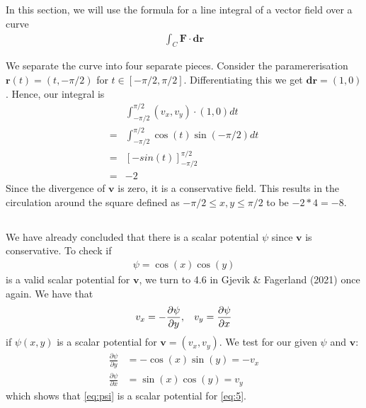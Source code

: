 \documentclass[a4paper,10pt,english]{article}
\begin{document}
\subsection{}
In this section, we will use the formula for a line integral of a vector field over a curve 
\begin{align}
    \int_C \bm{F} \cdot \bm{dr}
\end{align}

We separate the curve into four separate pieces. Consider the paramererisation $\bm{r}(t) = (t, -\pi/2)$ for $t\in[-\pi/2, \pi/2]$. Differentiating this we get $\bm{dr} = (1, 0)$. Hence, our integral is
\begin{align*}
    & \int_{-\pi/2}^{\pi/2} (v_x, v_y) \cdot (1, 0) dt \\
    = &\int_{-\pi/2}^{\pi/2} \cos(t)\sin(-\pi/2) dt \\
    = &\left[ -sin(t)\right]_{-\pi/2}^{\pi/2} \\
    = &-2
\end{align*}
Since the divergence of $\bm{v}$ is zero, it is a conservative field. This results in the circulation around the square defined as $-\pi/2 \leq x, y \leq \pi/2$ to be $-2*4 = -8$.

\subsection{}
We have already concluded that there is a scalar potential $\psi$ since $\bm{v}$ is conservative. To check if 
\begin{align}
    \psi = \cos(x)\cos(y)
    \label{eq:psi}
\end{align}
is a valid scalar potential for $\bm{v}$, we turn to 4.6 in Gjevik \& Fagerland (2021) once again. We have that 
\begin{align}
    v_x = -\frac{\partial \psi}{\partial y}, 
    \hspace{.3cm} v_y = \frac{\partial \psi}{\partial x}
\end{align}
if $\psi(x, y)$ is a scalar potential for $\bm{v} = (v_x, v_y)$. We test for our given $\psi$ and $\bm{v}$:
\begin{align*}
    \frac{\partial \psi}{\partial y} &= -\cos(x)\sin(y) = - v_x \\
    \frac{\partial \psi}{\partial x} &= \sin(x)\cos(y) = v_y
\end{align*}
which shows that \eqref{eq:psi} is a scalar potential for \eqref{eq:5}.
\end{document}
